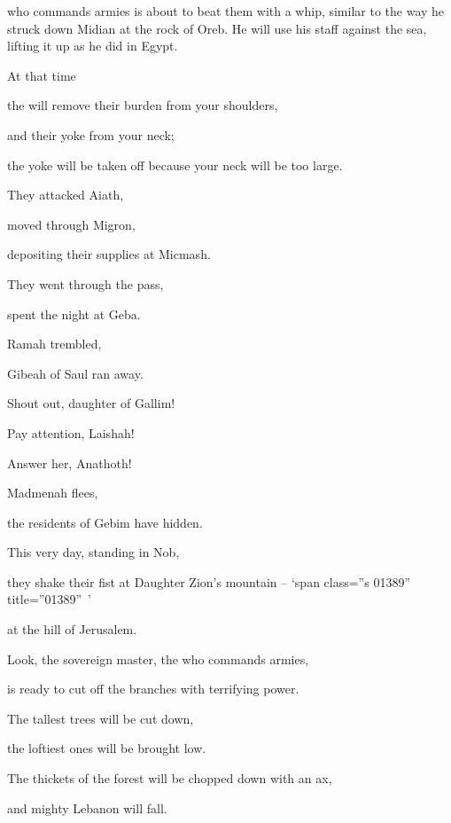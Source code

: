 {{}
who commands armies
is about to beat them with a whip,
similar
to the way
he struck down Midian
at the rock
of Oreb.
He will use his staff
against
the sea,
lifting
it up as he did in Egypt.
\par }{\Q {}At that time
\par }{\Q the
{} will remove
their burden
from
your shoulders,
\par }{\Q and their yoke
from
your neck;
\par }{\Q the yoke
will be taken off
because
your neck will be too large.
\par }{\Q They attacked
Aiath,
\par }{\Q moved through
Migron,
\par }{\Q depositing
their supplies
at Micmash.
\par }{\Q {}They went through
the pass,
\par }{\Q spent the night
at Geba.
\par }{\Q Ramah
trembled,
\par }{\Q Gibeah
of Saul
ran away.
\par }{\Q {}Shout out,
daughter
of Gallim!
\par }{\Q Pay attention,
Laishah!
\par }{\Q Answer her, Anathoth!
\par }{\Q {}Madmenah
flees,
\par }{\Q the residents
of Gebim have hidden.
\par }{\Q {}This very
day,
standing
in Nob,
\par }{\Q they shake their fist
at Daughter
Zion’s
mountain – ‘span class=”s 01389” title=”01389” ’
\par }{\Q at the hill
of Jerusalem.
\par }{\PP \par }{\Q {}Look,
the sovereign master,
the {}
who commands armies,
\par }{\Q is ready to cut off
the branches
with terrifying power.
\par }{\Q The tallest
trees will be cut down,
\par }{\Q the loftiest
ones will be brought low.
\par }{\Q {}The thickets
of the forest
will be chopped down
with an ax,
\par }{\Q and mighty
Lebanon
will fall.

\par }
